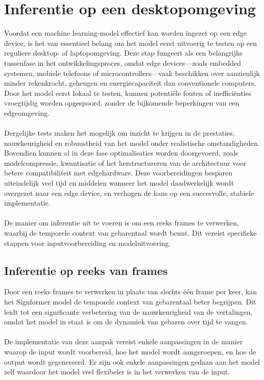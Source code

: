 \chapter{Inferentie op een desktopomgeving}
\label{ch:inferentie}

Voordat een machine learning-model effectief kan worden ingezet op een edge device, is het van essentieel belang om het model eerst uitvoerig te testen op een reguliere desktop- of laptopomgeving.
Deze stap fungeert als een belangrijke tussenfase in het ontwikkelingsproces, omdat edge devices—zoals embedded systemen, mobiele telefoons of microcontrollers—vaak beschikken over aanzienlijk minder rekenkracht, geheugen en energiecapaciteit dan conventionele computers.
Door het model eerst lokaal te testen, kunnen potentiële fouten of inefficiënties vroegtijdig worden opgespoord, zonder de bijkomende beperkingen van een edgeomgeving.
\\
\\
Dergelijke tests maken het mogelijk om inzicht te krijgen in de prestaties, nauwkeurigheid en robuustheid van het model onder realistische omstandigheden.
Bovendien kunnen al in deze fase optimalisaties worden doorgevoerd, zoals modelcompressie, kwantisatie of het herstructureren van de architectuur voor betere compatibiliteit met edgehardware.
Deze voorbereidingen besparen uiteindelijk veel tijd en middelen wanneer het model daadwerkelijk wordt overgezet naar een edge device, en verhogen de kans op een succesvolle, stabiele implementatie.
\\
\\
De manier om inferentie uit te voeren is om een reeks frames te verwerken, waarbij de temporele context van gebarentaal wordt benut. Dit vereist specifieke stappen voor inputvoorbereiding en modeluitvoering.


\section{Inferentie op reeks van frames}
\label{sec:inferentie-reeks-frames}

Door een reeks frames te verwerken in plaats van slechts één frame per keer, kan het Signformer model de temporele context van gebarentaal beter begrijpen.
Dit leidt tot een significante verbetering van de nauwkeurigheid van de vertalingen, omdat het model in staat is om de dynamiek van gebaren over tijd te vangen.
\\
\\
De implementatie van deze aanpak vereist enkele aanpassingen in de manier waarop de input wordt voorbereid, hoe het model wordt aangeroepen, en hoe de output wordt gegenereerd.
Er zijn ook enkele aanpassingen gedaan aan het model zelf waardoor het model veel flexibeler is in het verwerken van de input.
